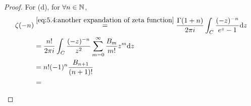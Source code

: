 \begin{proof}
    For (d), for  $ \forall n\in \mathbb N $,
    \begin{equation}
        \begin{aligned}
            \zeta(-n)&\overset{\eqref{eq:5.4:another expandation of zeta function}}{=}\frac{\Gamma(1+n)}{2\pi i}\int_C\frac{(-z)^{-n}}{e^z-1}\mathrm{d} z\\
            &=\frac{n!}{2\pi i}\int_C\frac{(-z)^{-n}}{z^2}\sum_{m=0}^\infty\frac{B_m}{m!}z^m\mathrm{d} z\\
            &=n!(-1)^n\frac{B_{n+1}}{(n+1)!}\\
            &=\frac{}{}
        \end{aligned}
    \end{equation} 
\end{proof}